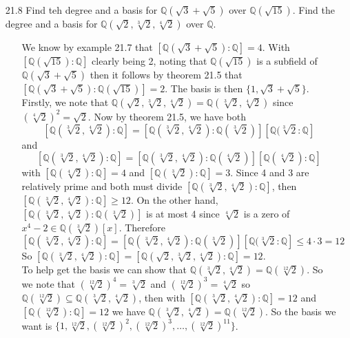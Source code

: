 \documentclass[12pt]{article}
\begin{document}
\begin{enumerate}
\item[21.8] Find teh degree and a basis for $\mathbb{Q}(\sqrt{3} + \sqrt{5})$ over $\mathbb{Q}(\sqrt{15})$. 
Find the degree and a basis for $\mathbb{Q}(\sqrt{2}, \sqrt[3]{2}, \sqrt[4]{2})$ over $\mathbb{Q}$.
\begin{enumerate}
\item[] We know by example 21.7 that $[\mathbb{Q}(\sqrt{3} + \sqrt{5}): \mathbb{Q}] = 4$.
With $[\mathbb{Q}(\sqrt{15}): \mathbb{Q}]$ clearly being 2, noting that
$\mathbb{Q}(\sqrt{15})$ is a subfield of $\mathbb{Q}(\sqrt{3} + \sqrt{5})$ then 
it follows by theorem 21.5 that $[\mathbb{Q}(\sqrt{3} + \sqrt{5}): \mathbb{Q}(\sqrt{15})] = 2$.
The basis is then $\{1, \sqrt{3} + \sqrt{5}\}$.\\
Firstly, we note that $\mathbb{Q}(\sqrt{2}, \sqrt[3]{2}, \sqrt[4]{2}) = 
\mathbb{Q}(\sqrt[3]{2}, \sqrt[4]{2})$ since $(\sqrt[4]{2})^2 = \sqrt{2}$. Now by theorem 21.5,
we have both 
\[
[\mathbb{Q}(\sqrt[3]{2}, \sqrt[4]{2}): \mathbb{Q}] = 
[\mathbb{Q}(\sqrt[3]{2}, \sqrt[4]{2}): \mathbb{Q}(\sqrt[3]{2})]
[\mathbb{Q}(\sqrt[3]{2}: \mathbb{Q}]
\] and
\[
[\mathbb{Q}(\sqrt[3]{2}, \sqrt[4]{2}): \mathbb{Q}] =
[\mathbb{Q}(\sqrt[3]{2}, \sqrt[4]{2}): \mathbb{Q}(\sqrt[4]{2})]
[\mathbb{Q}(\sqrt[4]{2}): \mathbb{Q}]
\]
with $[\mathbb{Q}(\sqrt[4]{2}): \mathbb{Q}] = 4$
and $[\mathbb{Q}(\sqrt[3]{2}): \mathbb{Q}] = 3$. Since 4 and 3 are relatively prime and both
must divide $[\mathbb{Q}(\sqrt[3]{2}, \sqrt[4]{2}): \mathbb{Q}]$, then 
$[\mathbb{Q}(\sqrt[3]{2}, \sqrt[4]{2}): \mathbb{Q}] \geq 12$. On the other hand, 
$[\mathbb{Q}(\sqrt[3]{2}, \sqrt[4]{2}): \mathbb{Q}(\sqrt[3]{2})]$ is at most 4 since
$\sqrt[4]{2}$ is a zero of $x^4 - 2 \in \mathbb{Q}(\sqrt[3]{2})[x]$. Therefore
\[
[\mathbb{Q}(\sqrt[3]{2}, \sqrt[4]{2}): \mathbb{Q}] =
[\mathbb{Q}(\sqrt[3]{2}, \sqrt[4]{2}): \mathbb{Q}(\sqrt[3]{2})]
[\mathbb{Q}(\sqrt[3]{2}: \mathbb{Q}] \leq 4 \cdot 3 = 12
\]
So $[\mathbb{Q}(\sqrt[3]{2}, \sqrt[4]{2}): \mathbb{Q}] = 
[\mathbb{Q}(\sqrt{2}, \sqrt[3]{2}, \sqrt[4]{2}): \mathbb{Q}] = 12$. \\
To help get the basis we can show that $\mathbb{Q}(\sqrt[3]{2}, \sqrt[4]{2}) = 
\mathbb{Q}(\sqrt[12]{2})$. So we note that $(\sqrt[12]{2})^4 = \sqrt[3]{2}$ and 
$(\sqrt[12]{2})^3 = \sqrt[4]{2}$ so $\mathbb{Q}(\sqrt[12]{2}) \subseteq 
\mathbb{Q}(\sqrt[3]{2}, \sqrt[4]{2})$, then with $[\mathbb{Q}(\sqrt[3]{2}, \sqrt[4]{2}): 
\mathbb{Q}] = 12$ and $[\mathbb{Q}(\sqrt[12]{2}): \mathbb{Q}] = 12$ we have 
$\mathbb{Q}(\sqrt[3]{2}, \sqrt[4]{2}) = \mathbb{Q}(\sqrt[12]{2})$. 
So the basis we want is 
$\{1, \sqrt[12]{2}, (\sqrt[12]{2})^2, (\sqrt[12]{2})^3, \ldots, (\sqrt[12]{2})^{11}\}$.
\end{enumerate}


\end{enumerate}
\end{document}
